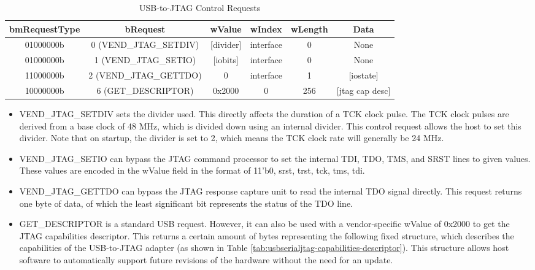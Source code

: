 \documentclass[main\_\_EN.tex]{subfiles}
\begin{document}
\begin{table}[H]
\centering
\caption{USB-to-JTAG Control Requests}
\label{tab:usbserialjtag-control-requests}

\begin{tabular}{|c|c|c|c|c|c|}\hline
\rowcolor{lightgray}
\textbf{bmRequestType} & \textbf{bRequest} & \textbf{wValue} & \textbf{wIndex} & \textbf{wLength} & \textbf{Data} \\\hline

01000000b &  0 (VEND\_JTAG\_SETDIV) & [divider] & interface & 0 &  None \\\hline
01000000b &  1 (VEND\_JTAG\_SETIO) &  [iobits] &  interface & 0 &   None \\\hline
11000000b &  2 (VEND\_JTAG\_GETTDO) & 0 & interface & 1 & [iostate] \\\hline
10000000b &  6 (GET\_DESCRIPTOR) &   0x2000 &  0 &  256 & [jtag cap desc] \\\hline
\end{tabular}
\end{table}

\begin{itemize}
\item VEND\_JTAG\_SETDIV sets the divider used. This directly affects the duration of a TCK clock pulse. The TCK clock pulses are derived from a base clock of 48 MHz, which is divided down using an internal divider. This control request allows the host to set this divider. Note that on startup, the divider is set to 2, which means the TCK clock rate will generally be 24 MHz.
\item VEND\_JTAG\_SETIO can bypass the JTAG command processor to set the internal TDI, TDO, TMS, and SRST lines to given values. These values are encoded in the wValue field in the format of {11'b0, srst, trst, tck, tms, tdi}.
\item VEND\_JTAG\_GETTDO can bypass the JTAG response capture unit to read the internal TDO signal directly. This request returns one byte of data, of which the least significant bit represents the status of the TDO line.
\item GET\_DESCRIPTOR is a standard USB request. However, it can also be used with a vendor-specific wValue of 0x2000 to get the JTAG capabilities descriptor. This returns a certain amount of bytes representing the following fixed structure, which describes the capabilities of the USB-to-JTAG adapter (as shown in Table \ref{tab:usbserialjtag-capabilities-descriptor}). This structure allows host software to automatically support future revisions of the hardware without the need for an update.
\end{itemize}
\end{document}
